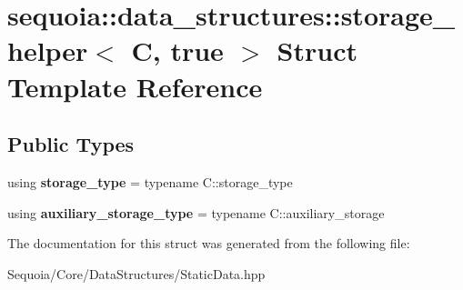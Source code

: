 \hypertarget{structsequoia_1_1data__structures_1_1storage__helper_3_01_c_00_01true_01_4}{}\section{sequoia\+::data\+\_\+structures\+::storage\+\_\+helper$<$ C, true $>$ Struct Template Reference}
\label{structsequoia_1_1data__structures_1_1storage__helper_3_01_c_00_01true_01_4}
\subsection*{Public Types}
\begin{DoxyCompactItemize}
\item 
\mbox{\label{structsequoia_1_1data__structures_1_1storage__helper_3_01_c_00_01true_01_4_acd0f0fe9bb0c4819771e608f52caf9d8}} 
using {\bfseries storage\+\_\+type} = typename C\+::storage\+\_\+type
\item 
\mbox{\label{structsequoia_1_1data__structures_1_1storage__helper_3_01_c_00_01true_01_4_a83ae979bf6e50ee5017f69e14b5d0579}} 
using {\bfseries auxiliary\+\_\+storage\+\_\+type} = typename C\+::auxiliary\+\_\+storage
\end{DoxyCompactItemize}


The documentation for this struct was generated from the following file\+:\begin{DoxyCompactItemize}
\item 
Sequoia/\+Core/\+Data\+Structures/Static\+Data.\+hpp\end{DoxyCompactItemize}
